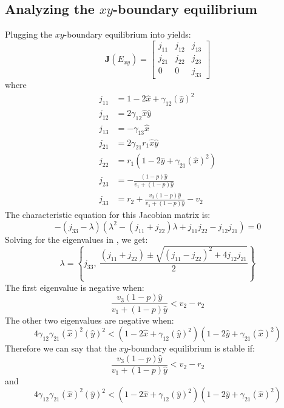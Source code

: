 \subsection{Analyzing the $xy$-boundary equilibrium}\label{subsec:stability_xy_boundary_equilibrium}
Plugging the $xy$-boundary equilibrium into  yields:
\begin{equation}
    \textbf{J}\left(E_{xy}\right)=\begin{bmatrix}
        j_{11} & j_{12} & j_{13}\\
        j_{21} & j_{22} & j_{23}\\
        0 & 0 & j_{33}
    \end{bmatrix}
    \label{eq:5.10}
\end{equation}
where
\begin{align*}
    j_{11} &= 1-2\hat{x}+\gamma_{12}\left(\hat{y}\right)^2\\
    j_{12} &= 2\gamma_{12}\hat{x}\hat{y}\\
    j_{13} &= -\gamma_{13}\hat{x}\\
    j_{21} &= 2\gamma_{21}r_1\hat{x}\hat{y}\\
    j_{22} &= r_1\left(1-2\hat{y}+\gamma_{21}\left(\hat{x}\right)^2\right)\\
    j_{23} &= -\frac{\left(1-p\right)\hat{y}}{v_1+\left(1-p\right)\hat{y}}\\
    j_{33} &= r_2+\frac{v_3\left(1-p\right)\hat{y}}{v_1+\left(1-p\right)\hat{y}}-v_2
\end{align*}
The characteristic equation for this Jacobian matrix is:
\begin{equation}
    -\left(j_{33}-\lambda\right)\left(\lambda^2-\left(j_{11}+j_{22}\right)\lambda+j_{11}j_{22}-j_{12}j_{21}\right)=0
    \label{eq:5.11}
\end{equation}
Solving for the eigenvalues in , we get:
\[
\lambda=\left\{
j_{33},\ 
\frac{\left(j_{11}+j_{22}\right) \pm \sqrt{\left(j_{11}-j_{22}\right)^2+4j_{12}j_{21}}}{2}
\right\}
\]
The first eigenvalue is negative when:
\[
\frac{v_3\left(1-p\right)\hat{y}}{v_1+\left(1-p\right)\hat{y}}<v_2-r_2
\]
The other two eigenvalues are negative when:
\[
4\gamma_{12}\gamma_{21}\left(\hat{x}\right)^2\left(\hat{y}\right)^2<\left(1-2\hat{x}+\gamma_{12}\left(\hat{y}\right)^2\right)\left(1-2\hat{y}+\gamma_{21}\left(\hat{x}\right)^2\right)
\]
Therefore we can say that the $xy$-boundary equilibrium is stable if:
\[
\frac{v_3\left(1-p\right)\hat{y}}{v_1+\left(1-p\right)\hat{y}}<v_2-r_2
\]
and
\[
4\gamma_{12}\gamma_{21}\left(\hat{x}\right)^2\left(\hat{y}\right)^2<\left(1-2\hat{x}+\gamma_{12}\left(\hat{y}\right)^2\right)\left(1-2\hat{y}+\gamma_{21}\left(\hat{x}\right)^2\right)
\]

